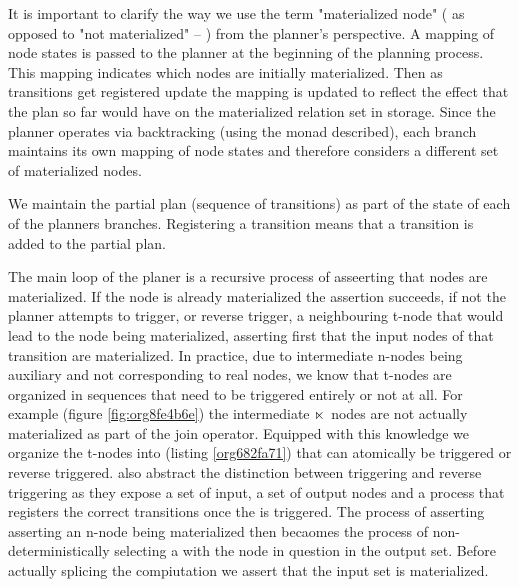 It is important to clarify the way we use the term "materialized node"
( as opposed to "not materialized" -- ) from the planner's
perspective. A mapping of node states is passed to the planner at the
beginning of the planning process. This mapping indicates which nodes
are initially materialized. Then as transitions get registered update
the mapping is updated to reflect the effect that the plan so far
would have on the materialized relation set in storage. Since the
planner operates via backtracking (using the  monad described),
each branch maintains its own mapping of node states and therefore
considers a different set of materialized nodes.

We maintain the partial plan (sequence of transitions) as part of the
state of each of the planners branches. Registering a transition means
that a transition is added to the partial plan.

The main loop of the planer is a recursive process of asseerting that
nodes are materialized. If the node is already materialized the
assertion succeeds, if not the planner attempts to trigger, or reverse
trigger, a neighbouring t-node that would lead to the node being
materialized, asserting first that the input nodes of that transition
are materialized. In practice, due to intermediate n-nodes being
auxiliary and not corresponding to real nodes, we know that t-nodes
are organized in sequences that need to be triggered entirely or not
at all. For example (figure \ref{fig:org8fe4b6e}) the intermediate
\(\ltimes\) nodes are not actually materialized as part of the join
operator. Equipped with this knowledge we organize the t-nodes into
 (listing \ref{org682fa71}) that can atomically be triggered or
reverse triggered.  also abstract the distinction between
triggering and reverse triggering as they expose a set of input, a set
of output nodes and a process that registers the correct transitions
once the  is triggered. The process of asserting asserting an
n-node being materialized then becaomes the process of
non-deterministically selecting a  with the node in question
in the output set. Before actually splicing the  compiutation
we assert that the input set is materialized.


